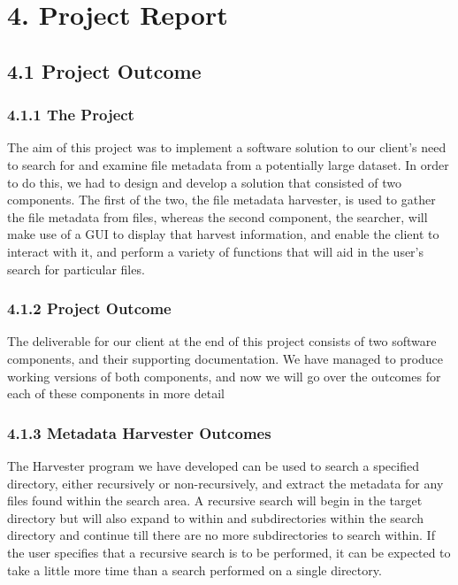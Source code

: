 \documentclass[11pt]{article}
\begin{document}

\section{4. Project Report}
\subsection{4.1 Project Outcome}

\subsubsection{4.1.1 The Project}
The aim of this project was to implement a software solution to our client’s need to search for and examine file metadata from a potentially large dataset. In order to do this, we had to design and develop a solution that consisted of two components. The first of the two, the file metadata harvester, is used to gather the file metadata from files, whereas the second component, the searcher, will make use of a GUI to display that harvest information, and enable the client to interact with it, and perform a variety of functions that will aid in the user’s search for particular files.

\subsubsection{4.1.2 Project Outcome} 
The deliverable for our client at the end of this project consists of two software components, and their supporting documentation. We have managed to produce working versions of both components, and now we will go over the outcomes for each of these components in more detail

\subsubsection{4.1.3 Metadata Harvester Outcomes}
The Harvester program we have developed can be used to search a specified directory, either recursively or non-recursively, and extract the metadata for any files found within the search area. A recursive search will begin in the target directory but will also expand to within and subdirectories within the search directory and continue till there are no more subdirectories to search within. If the user specifies that a recursive search is to be performed, it can be expected to take a little more time than a search performed on a single directory. \\
\end{document}
